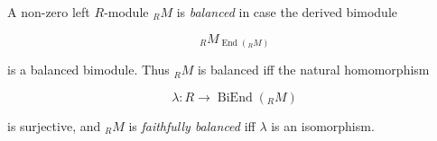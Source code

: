 A non-zero left $R$-module $_R M$ is \textit{balanced} in case the derived bimodule

$$_R M_{\operatorname{End}(_R M)}$$

is a balanced bimodule. Thus $_R M$ is balanced iff the natural homomorphism

$$\lambda: R \rightarrow \operatorname{BiEnd}(_R M)$$

is surjective, and $_R M$ is \textit{faithfully balanced} iff $\lambda$ is an isomorphism.
